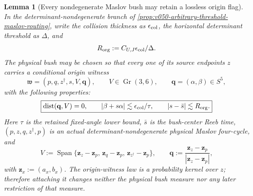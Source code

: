 \documentclass[10pt]{article}
\newtheorem{lemma}[theorem]{Lemma}
\newcommand{\dist}{\operatorname{dist}}
\newcommand{\Gr}{\operatorname{Gr}}
\newcommand{\Span}{\operatorname{Span}}
\begin{document}
\begin{lemma}[Every nondegenerate Maslov bush may retain a lossless origin flag]
\label{lem:v081-origin-marked-bush}
In the determinant-nondegenerate branch of
\cref{prop:v050-arbitrary-threshold-maslov-routing}, write the collision thickness as
\(\epsilon_{\rm col}\), the horizontal determinant threshold as \(\Delta\), and
\[
R_{\rm org}:=C_{U,J}\epsilon_{\rm col}/\Delta.
\]
The physical bush may be chosen so that every one of its source endpoints \(z\) carries a
conditional origin witness
\[
\mathfrak w=(p,q,z^\dagger,s,V,\mathbf q),
\qquad
V\in\Gr(3,6),
\qquad
\mathbf q=(\alpha,\beta)\in S^5,
\]
with the following properties:
\begin{equation}
\label{eq:v081-origin-marked-bush}
\boxed{
\dist(\mathbf q,V)=0,
\qquad
|\beta+s\alpha|
\lesssim
\epsilon_{\rm col}/\tau,
\qquad
|s-\bar s|\lesssim R_{\rm org}.
}
\end{equation}
Here \(\tau\) is the retained fixed-angle lower bound, \(\bar s\) is the bush-center Reeb time,
\((p,z,q,z^\dagger,p)\) is an actual determinant-nondegenerate physical Maslov four-cycle, and
\[
V
:=
\Span\{
\mathbf z_z-\mathbf z_p,\,
\mathbf z_q-\mathbf z_p,\,
\mathbf z_{z^\dagger}-\mathbf z_p
\},
\qquad
\mathbf q
:=
\frac{\mathbf z_z-\mathbf z_p}{|\mathbf z_z-\mathbf z_p|},
\]
with \(\mathbf z_x:=(a_x,b_x)\).  The origin-witness law is a probability kernel over \(z\);
therefore attaching it changes neither the physical bush measure nor any later restriction of that
measure.
\end{lemma}
\end{document}
